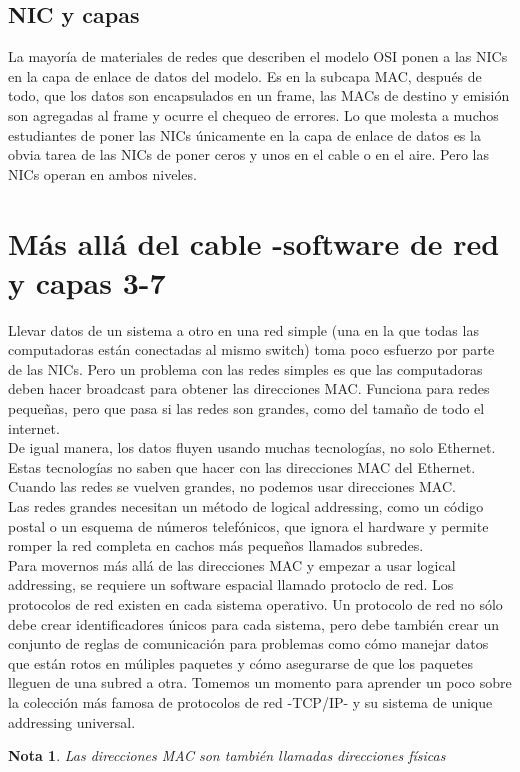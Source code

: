 \documentclass[12pt]{report}
\newtheorem{nota}{Nota}
\begin{document}
\subsection{NIC y capas}
La mayoría de materiales de redes que describen el modelo OSI ponen
a las NICs en la capa de enlace de datos del modelo. 
Es en la subcapa MAC, después de todo, que los datos son encapsulados en un frame,
las MACs de destino y emisión son agregadas al frame y ocurre el chequeo de errores.
Lo que molesta a muchos estudiantes de poner las NICs únicamente en la capa 
de enlace de datos es la obvia tarea de las NICs de poner ceros y unos en el cable o en el aire.
Pero las NICs operan en ambos niveles.

\section{Más allá del cable -software de red y capas 3-7}
Llevar datos de un sistema a otro en una red simple (una en la que todas las computadoras
están conectadas al mismo switch) toma poco esfuerzo por parte de las NICs.
Pero un problema con las redes simples es que las computadoras deben hacer broadcast
para obtener las direcciones MAC. Funciona para redes pequeñas, pero que pasa si las redes 
son grandes, como del tamaño de todo el internet.\\
De igual manera, los datos fluyen usando muchas tecnologías, no solo Ethernet.
Estas tecnologías no saben que hacer con las direcciones MAC del Ethernet. 
Cuando las redes se vuelven grandes, no podemos usar direcciones MAC.\\
Las redes grandes necesitan un método de logical addressing, como un código postal
o un esquema de números telefónicos, que ignora el hardware y permite 
romper la red completa en cachos más pequeños llamados subredes.\\
Para movernos más allá de las direcciones MAC y empezar a usar
logical addressing, se requiere un software espacial llamado protoclo de red.
Los protocolos de red existen en cada sistema operativo. 
Un protocolo de red no sólo debe crear identificadores únicos para cada sistema,
pero debe también crear un conjunto de reglas de comunicación para problemas como
cómo manejar datos que están rotos en múliples paquetes y cómo asegurarse 
de que los paquetes lleguen de una subred a otra.
Tomemos un momento para aprender un poco sobre la colección más famosa
de protocolos de red -TCP/IP- y su sistema de unique addressing universal.

\begin{nota}
Las direcciones MAC son también llamadas direcciones físicas
\end{nota}
\end{document}
